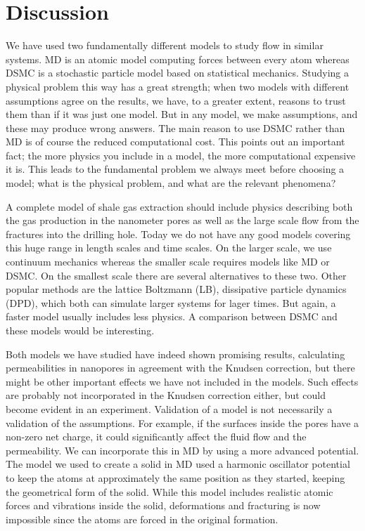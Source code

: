 \section{Discussion}
We have used two fundamentally different models to study flow in similar systems. MD is an atomic model computing forces between every atom whereas DSMC is a stochastic particle model based on statistical mechanics. Studying a physical problem this way has a great strength; when two models with different assumptions agree on the results, we have, to a greater extent, reasons to trust them than if it was just one model. But in any model, we make assumptions, and these may produce wrong answers. The main reason to use DSMC rather than MD is of course the reduced computational cost. This points out an important fact; the more physics you include in a model, the more computational expensive it is. This leads to the fundamental problem we always meet before choosing a model; what is the physical problem, and what are the relevant phenomena?

A complete model of shale gas extraction should include physics describing both the gas production in the nanometer pores as well as the large scale flow from the fractures into the drilling hole. Today we do not have any good models covering this huge range in length scales and time scales. On the larger scale, we use continuum mechanics whereas the smaller scale requires models like MD or DSMC. On the smallest scale there are several alternatives to these two. Other popular methods are the lattice Boltzmann (LB), dissipative particle dynamics (DPD), which both can simulate larger systems for lager times. But again, a faster model usually includes less physics. A comparison between DSMC and these models would be interesting.

Both models we have studied have indeed shown promising results, calculating permeabilities in nanopores in agreement with the Knudsen correction, but there might be other important effects we have not included in the models. Such effects are probably not incorporated in the Knudsen correction either, but could become evident in an experiment. Validation of a model is not necessarily a validation of the assumptions. For example, if the surfaces inside the pores have a non-zero net charge, it could significantly affect the fluid flow and the permeability. We can incorporate this in MD by using a more advanced potential. The model we used to create a solid in MD used a harmonic oscillator potential to keep the atoms at approximately the same position as they started, keeping the geometrical form of the solid. While this model includes realistic atomic forces and vibrations inside the solid, deformations and fracturing is now impossible since the atoms are forced in the original formation.

